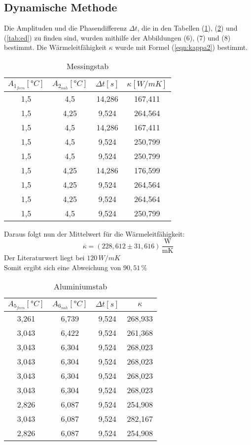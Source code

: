 \subsection{Dynamische Methode}
Die Amplituden und die Phasendifferenz $\Delta t$,
die in den Tabellen (\ref{tab:mes}), (\ref{tab:al}) und (\ref{tab:ed}) zu finden sind,
wurden mithilfe der Abbildungen (6), (7) und (8) bestimmt.
Die Wärmeleitfähigkeit $\kappa$ wurde mit Formel (\ref{eqn:kappa2}) bestimmt.
\begin{table}[H]
  \centering
  \caption{Messingstab}
  \label{tab:mes}
  \begin{tabular}{c c c c}
    \toprule $A_{1_{fern}}[°C]$ & $A_{2_{nah}}[°C]$ & $\Delta t[s]$ & $\kappa[W/mK]$ \\
    \midrule
    1,5 & 4,5  & 14,286 & 167,411 \\
    1,5 & 4,25 & 9,524  & 264,564 \\
    1,5 & 4,5  & 14,286 & 167,411 \\
    1,5 & 4,5  & 9,524  & 250,799 \\
    1,5 & 4,5  & 9,524  & 250,799 \\
    1,5 & 4,25 & 14,286 & 176,599 \\
    1,5 & 4,25 & 9,524  & 264,564 \\
    1,5 & 4,25 & 9,524  & 264,564 \\
    1,5 & 4,5  & 9,524  & 250,799 \\
    \bottomrule
  \end{tabular}
\end{table}
Daraus folgt nun der Mittelwert für die Wärmeleitfähigkeit:
\begin{equation}
\overline \kappa = (228,612\pm 31,616)\, \mathrm{\frac{W}{mK}}
\end{equation}
Der Literaturwert liegt bei $120\, W/mK$ \cite{on2}\\
Somit ergibt sich eine Abweichung von $90,51\, \%$
\begin{table}[H]
  \centering
  \caption{Aluminiumstab}
  \label{tab:al}
  \begin{tabular}{c c c c}
    \toprule $A_{5_{fern}}[°C]$ & $A_{6_{nah}}[°C]$ & $\Delta t[s]$ & $\kappa$ \\
    \midrule
    3,261  & 6,739 & 9,524  & 268,933 \\
    3,043  & 6,422 & 9,524  & 261,368 \\
    3,043  & 6,304 & 9,524  & 268,023 \\
    3,043  & 6,304 & 9,524  & 268,023 \\
    3,043  & 6,304 & 9,524  & 268,023 \\
    3,043  & 6,304 & 9,524  & 268,023 \\
    2,826  & 6,087 & 9,524  & 254,908 \\
    3,043  & 6,087 & 9,524  & 282,167 \\
    2,826  & 6,087 & 9,524  & 254,908 \\
    \bottomrule
  \end{tabular}
\end{table}
